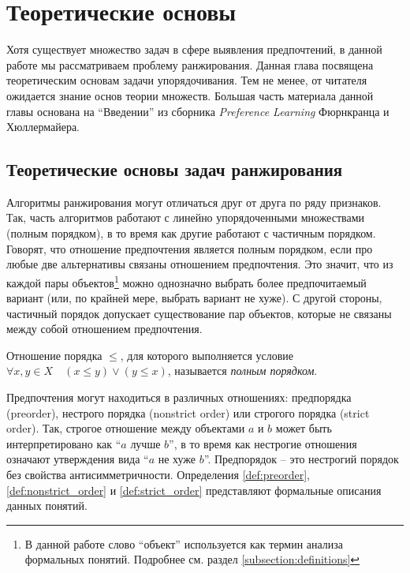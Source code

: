 \chapter{Теоретические основы}
\label{chapter:theory}

Хотя существует множество задач в сфере выявления предпочтений, в данной работе мы рассматриваем проблему ранжирования. Данная глава посвящена теоретическим основам задачи упорядочивания. Тем не менее, от читателя ожидается знание основ теории множеств. Большая часть материала данной главы основана на \enquote{Введении} из сборника \textit{Preference Learning} Фюрнкранца и Хюллермайера\cite{plbook:Introduction:2010}.


\section{Теоретические основы задач ранжирования}

	Алгоритмы ранжирования могут отличаться друг от друга по ряду признаков. Так, часть алгоритмов работают с линейно упорядоченными множествами (полным порядком), в то время как другие работают с частичным порядком. Говорят, что отношение предпочтения является полным порядком, если про любые две альтернативы связаны отношением предпочтения. Это значит, что из каждой пары объектов\footnote{В данной работе слово \enquote{объект} используется как термин анализа формальных понятий. Подробнее см. раздел \ref{subsection:definitions}} можно однозначно выбрать более предпочитаемый вариант (или, по крайней мере, выбрать вариант не хуже). С другой стороны, частичный порядок допускает существование пар объектов, которые не связаны между собой отношением предпочтения. 
	\begin{definition}
	\label{def:total_order}
		Отношение порядка $\leq$, для которого выполняется условие
		$\forall x,y\in X \quad  ( x\leq y) \vee (y \leq x)$,
		называется \emph{полным порядком}.
	\end{definition}
	
	Предпочтения могут находиться в различных отношениях: предпорядка (preorder), нестрого порядка (nonstrict order) или строгого порядка (strict order). Так, строгое отношение между объектами $a$ и $b$ может быть интерпретировано как \enquote{$a$ лучше $b$}, в то время как нестрогие отношения означают утверждения вида \enquote{$a$ не хуже $b$}\cite[p.~384]{Barten:1982}. Предпорядок – это нестрогий порядок без свойства антисимметричности. Определения \ref{def:preorder}, \ref{def:nonstrict_order} и \ref{def:strict_order} представляют формальные описания данных понятий.
	
